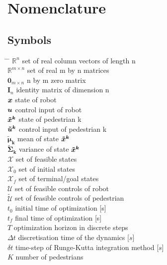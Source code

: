 \chapter*{Nomenclature}

\section*{Symbols}
\begin{tabbing}
\hspace*{1.6cm} \= \hspace*{8cm} \= \kill
$\mathbb{R}^n$ \> set of real column vectors of length n \\[0.5ex]
$\mathbb{R}^{m \times n}$ \> set of real m by n matrices \\[0.5ex]
$\mathbf{0}_{m \times n}$ \> n by m zero matrix \\[0.5ex]
$\mathbf{I}_n$ \> identity matrix of dimension n \\[0.5ex]
$\boldsymbol{x}$ \> state of robot \\[0.5ex]
$\boldsymbol{u}$ \> control input of robot \\[0.5ex]
$\xped[k]$ \> state of pedestrian k \\[0.5ex]
$\uped[k]$ \> control input of pedestrian k \\[0.5ex]
$\mathbf{\tilde{\mu}_k}$ \> mean of state $\xped[k]$ \\[0.5ex]
$\mathbf{\tilde{\Sigma}_k}$ \> variance of state $\xped[k]$ \\[0.5ex]
$\mathcal{X}$ \> set of feasible states \\[0.5ex]
$\mathcal{X}_0$ \> set of initial states \\[0.5ex]
$\mathcal{X}_f$ \> set of terminal/goal states \\[0.5ex]
$\mathcal{U}$ \> set of feasible controls of robot \\[0.5ex]
$\mathcal{\tilde{U}}$ \> set of feasible controls of pedestrian \\[0.5ex]
$t_0$ \> initial time of optimization [s] \\[0.5ex]
$t_f$ \> final time of optimization [s] \\[0.5ex]
$T$ \> optimization horizon in discrete steps \\[0.5ex]
$\Delta t$ \> discretisation time of the dynamics [$s$] \\[0.5ex]
$\delta t$ \> time-step of Runge-Kutta integration method [$s$] \\[0.5ex]
$K$ \> number of pedestrians \\[0.5ex]

\end{tabbing}
